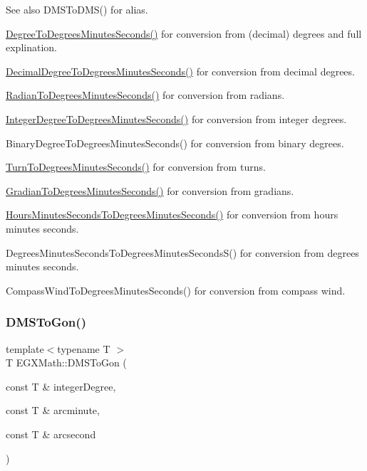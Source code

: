 \begin{DoxySeeAlso}{See also}
D\+M\+S\+To\+D\+M\+S() for alias. 

\mbox{\hyperlink{group___e_g_x_math-_angle_conversions-_degree_ga859585939255d52d010c780c68eb6e23}{Degree\+To\+Degrees\+Minutes\+Seconds()}} for conversion from (decimal) degrees and full explination. 

\mbox{\hyperlink{group___e_g_x_math-_angle_conversions-_decimal_degree_gac5a5255c8d120f71b60d8f60de1a1b6e}{Decimal\+Degree\+To\+Degrees\+Minutes\+Seconds()}} for conversion from decimal degrees. 

\mbox{\hyperlink{group___e_g_x_math-_angle_conversions-_radian_gadae98c255924fdc8b232b6539eae81a9}{Radian\+To\+Degrees\+Minutes\+Seconds()}} for conversion from radians. 

\mbox{\hyperlink{group___e_g_x_math-_angle_conversions-_integer_degree_ga204317877546ea6bbafe5ff558f55a16}{Integer\+Degree\+To\+Degrees\+Minutes\+Seconds()}} for conversion from integer degrees. 

Binary\+Degree\+To\+Degrees\+Minutes\+Seconds() for conversion from binary degrees. 

\mbox{\hyperlink{group___e_g_x_math-_angle_conversions-_turn_gaefdee18d878c2e66e7bd737c8900ab30}{Turn\+To\+Degrees\+Minutes\+Seconds()}} for conversion from turns. 

\mbox{\hyperlink{group___e_g_x_math-_angle_conversions-_gradian_ga5c81967ddb8f677634d161713174e419}{Gradian\+To\+Degrees\+Minutes\+Seconds()}} for conversion from gradians. 

\mbox{\hyperlink{group___e_g_x_math-_angle_conversions-_hours_minutes_seconds_gae9eb0acc65dfe6119936f29ac292afaa}{Hours\+Minutes\+Seconds\+To\+Degrees\+Minutes\+Seconds()}} for conversion from hours minutes seconds. 

Degrees\+Minutes\+Seconds\+To\+Degrees\+Minutes\+Seconds\+S() for conversion from degrees minutes seconds. 

Compass\+Wind\+To\+Degrees\+Minutes\+Seconds() for conversion from compass wind. 
\end{DoxySeeAlso}
\mbox{\label{group___e_g_x_math-_angle_conversions-_d_m_s_ga47fe1b9127ec6b73ee759eef038a8eb6}} 
\subsubsection{\texorpdfstring{D\+M\+S\+To\+Gon()}{DMSToGon()}}
{\footnotesize\ttfamily template$<$typename T $>$ \\
T E\+G\+X\+Math\+::\+D\+M\+S\+To\+Gon (\begin{DoxyParamCaption}\item[{const T \&}]{integer\+Degree,  }\item[{const T \&}]{arcminute,  }\item[{const T \&}]{arcsecond }\end{DoxyParamCaption})}



